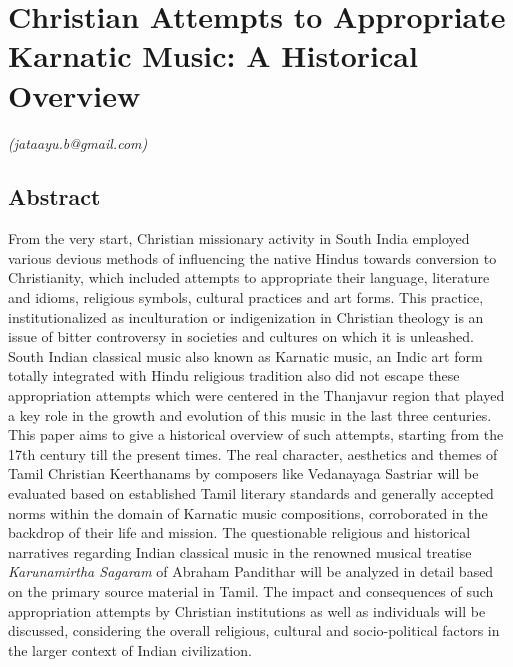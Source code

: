 
\chapter{Christian Attempts to Appropriate Karnatic Music: A Historical Overview}\label{chapter5}


\begin{flushright}
\textit{(jataayu.b@gmail.com)}
\end{flushright}


\section*{Abstract}

From the very start, Christian missionary activity in South India employed various devious methods of influencing the native Hindus towards conversion to Christianity, which included attempts to appropriate their language, literature and idioms, religious symbols, cultural practices and art forms. This practice, institutionalized as inculturation or indigenization in Christian theology is an issue of bitter controversy in societies and cultures on which it is unleashed. South Indian classical music also known as Karnatic music, an Indic art form totally integrated with Hindu religious tradition also did not escape these appropriation attempts which were centered in the Thanjavur region that played a key role in the growth and evolution of this music in the last three centuries. This paper aims to give a historical overview of such attempts, starting from the 17th century till the present times. The real character, aesthetics and themes of Tamil Christian Keerthanams by composers like Vedanayaga Sastriar will be evaluated based on established Tamil literary standards and generally accepted norms within the domain of Karnatic music compositions, corroborated in the backdrop of their life and mission. The questionable religious and historical narratives regarding Indian classical music in the renowned musical treatise \textit{Karunamirtha Sagaram} of Abraham Pandithar will be analyzed in detail based on the primary source material in Tamil. The impact and consequences of such appropriation attempts by Christian institutions as well as individuals will be discussed, considering the overall religious, cultural and socio-political factors in the larger context of Indian civilization.

\vspace{-.3cm}

